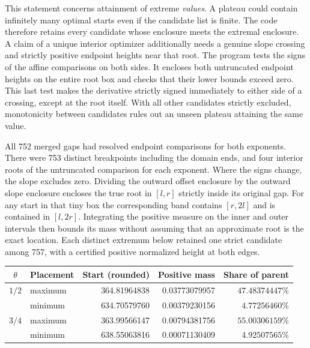 \documentclass[12pt,letterpaper]{article}
\begin{document}
This statement concerns attainment of extreme \emph{values}. A plateau could contain infinitely many optimal starts even if the candidate list is finite. The code therefore retains every candidate whose enclosure meets the extremal enclosure. A claim of a unique interior optimizer additionally needs a genuine slope crossing and strictly positive endpoint heights near that root. The program tests the signs of the affine comparisons on both sides. It encloses both untruncated endpoint heights on the entire root box and checks that their lower bounds exceed zero. This last test makes the derivative strictly signed immediately to either side of a crossing, except at the root itself. With all other candidates strictly excluded, monotonicity between candidates rules out an unseen plateau attaining the same value.

All 752 merged gaps had resolved endpoint comparisons for both exponents. There were 753 distinct breakpoints including the domain ends, and four interior roots of the untruncated comparison for each exponent. Where the signs change, the slope excludes zero. Dividing the outward offset enclosure by the outward slope enclosure encloses the true root in $[l,r]$ strictly inside its original gap. For any start in that tiny box the corresponding band contains $[r,2l]$ and is contained in $[l,2r]$. Integrating the positive measure on the inner and outer intervals then bounds its mass without assuming that an approximate root is the exact location. Each distinct extremum below retained one strict candidate among 757, with a certified positive normalized height at both edges.

\begin{center}\small
\begin{tabular}{@{}clrrr@{}}
\toprule
$\theta$ & Placement & Start (rounded) & Positive mass & Share of parent\\
\midrule
$1/2$ & maximum & 364.81964838 & 0.03773079957 & $47.48374447\%$\\
      & minimum & 634.70579760 & 0.00379230156 & $4.77256460\%$\\
$3/4$ & maximum & 363.99566147 & 0.00794381756 & $55.00306159\%$\\
      & minimum & 638.55063816 & 0.00071130409 & $4.92507565\%$\\
\bottomrule
\end{tabular}
\end{center}
\end{document}
